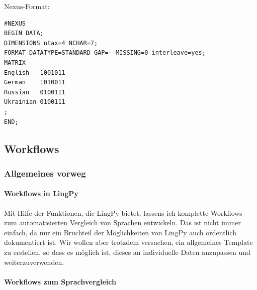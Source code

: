 Nexus-Format:

\begin{verbatim}
#NEXUS
BEGIN DATA;
DIMENSIONS ntax=4 NCHAR=7;
FORMAT DATATYPE=STANDARD GAP=- MISSING=0 interleave=yes;
MATRIX
English   1001011
German    1010011
Russian   0100111
Ukrainian 0100111
;
END;
\end{verbatim}

\subsection{Workflows}

\subsubsection{\texorpdfstring{{Allgemeines
vorweg}}{Allgemeines vorweg}}

\paragraph{Workflows in LingPy}

Mit Hilfe der Funktionen, die LingPy bietet, lassens ich komplette
Workflows zum automatisierten Vergleich von Sprachen entwickeln. Das ist
nicht immer einfach, da nur ein Bruchteil der Möglichkeiten von LingPy
auch ordentlich dokumentiert ist. Wir wollen aber trotzdem versuchen,
ein allgemeines Template zu erstellen, so dass es möglich ist, dieses an
individuelle Daten anzupassen und weiterzuverwenden.




\paragraph{Workflows zum Sprachvergleich}

